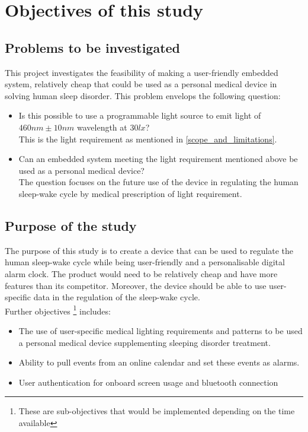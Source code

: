 \section{Objectives of this study}

\subsection{Problems to be investigated}
This project investigates the feasibility of making a user-friendly embedded system, relatively cheap that could be used as a personal medical device in solving human sleep disorder. This problem envelops the following question:
\begin{itemize}
\item[1] Is this possible to use a programmable light source to emit light of $460nm \pm 10nm$ wavelength at $30 lx$?\\
This is the light requirement as mentioned in \cref{scope_and_limitations}.
\item[2] Can an embedded system meeting the light requirement mentioned above be used as a personal medical device?\\
The question focuses on the future use of the device in regulating the human sleep-wake cycle by medical prescription of light requirement.
\end{itemize}

\subsection{Purpose of the study}\label{purpose_of_the_study}
The purpose of this study is to create a device that can be used to regulate the human sleep-wake cycle while being user-friendly and a personalisable digital alarm clock. The product would need to be relatively cheap and have more features than its competitor. Moreover, the device should be able to use user-specific data in the regulation of the sleep-wake cycle.\\
Further objectives \footnote{These are sub-objectives that would be implemented depending on the time available} includes:
\begin{itemize}
\item The use of user-specific medical lighting requirements and patterns to be used a personal medical device supplementing sleeping disorder treatment.
\item Ability to pull events from an online calendar and set these events as alarms.
\item User authentication for onboard screen usage and bluetooth connection  
\end{itemize} 



